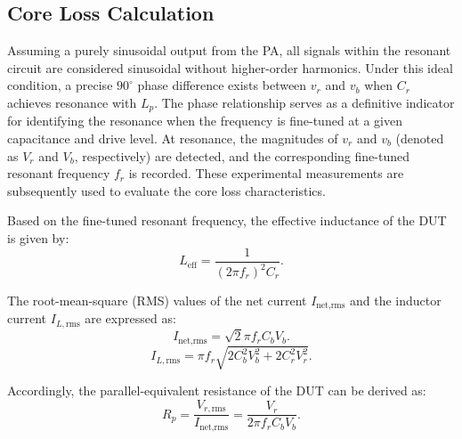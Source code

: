 \documentclass[conference]{IEEEtran}
\begin{document}

 \subsection{Core Loss Calculation}

Assuming a purely sinusoidal output from the PA, all signals within the resonant circuit are considered sinusoidal without higher-order harmonics. Under this ideal condition, a precise $90^\circ$ phase difference exists between $v_r$ and $v_b$ when $C_r$ achieves resonance with $L_p$. The phase relationship serves as a definitive indicator for identifying the resonance when the frequency is fine-tuned at a given capacitance and drive level. At resonance, the magnitudes of $v_r$ and $v_b$ (denoted as $V_r$ and $V_b$, respectively) are detected, and the corresponding fine-tuned resonant frequency $f_r$ is recorded. These experimental measurements are subsequently used to evaluate the core loss characteristics.

Based on the fine-tuned resonant frequency, the effective inductance of the DUT is given by:
\begin{equation} 
\label{eq:L_eff}
L_{\text{eff}} = \frac{1}{(2\pi f_r)^2 C_r}.
\end{equation}

The root-mean-square (RMS) values of the net current $I_{\text{net,rms}}$ and the inductor current $I_{L,\text{rms}}$ are expressed as:
\begin{equation} 
\label{eq:I_net_rms}
I_{\text{net,rms}} = \sqrt{2}\pi f_r C_b V_b.
\end{equation}
\begin{equation} 
\label{eq:I_L_rms}
I_{L,\text{rms}} = \pi f_r \sqrt{2C_b^2 V_b^2 + 2C_r^2 V_r^2}.
\end{equation}

Accordingly, the parallel-equivalent resistance of the DUT can be derived as:
\begin{equation} 
\label{eq:R_p}
R_p = \frac{V_{r,\text{rms}}}{I_{\text{net,rms}}} = \frac{V_r}{2\pi f_r C_b V_b}.
\end{equation}
\end{document}

